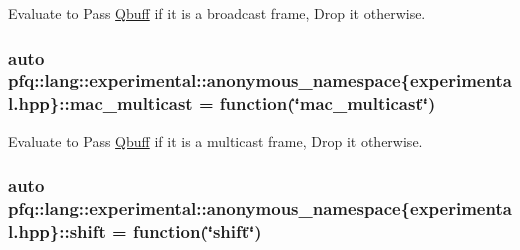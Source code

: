 Evaluate to {\ttfamily Pass} \hyperlink{structpfq_1_1lang_1_1Qbuff}{Qbuff} if it is a broadcast frame, {\ttfamily Drop} it otherwise. 

\subsubsection[{\texorpdfstring{mac\+\_\+multicast}{mac_multicast}}]{\setlength{\rightskip}{0pt plus 5cm}auto pfq\+::lang\+::experimental\+::anonymous\+\_\+namespace\{experimental.\+hpp\}\+::mac\+\_\+multicast = {\bf function}(\char`\"{}mac\+\_\+multicast\char`\"{})}\hypertarget{namespacepfq_1_1lang_1_1experimental_1_1anonymous__namespace_02experimental_8hpp_03_a0c39849f9e3e8677342842f88a8ee37c}{}\label{namespacepfq_1_1lang_1_1experimental_1_1anonymous__namespace_02experimental_8hpp_03_a0c39849f9e3e8677342842f88a8ee37c}


Evaluate to {\ttfamily Pass} \hyperlink{structpfq_1_1lang_1_1Qbuff}{Qbuff} if it is a multicast frame, {\ttfamily Drop} it otherwise. 

\subsubsection[{\texorpdfstring{shift}{shift}}]{\setlength{\rightskip}{0pt plus 5cm}auto pfq\+::lang\+::experimental\+::anonymous\+\_\+namespace\{experimental.\+hpp\}\+::shift = {\bf function}(\char`\"{}shift\char`\"{})}\hypertarget{namespacepfq_1_1lang_1_1experimental_1_1anonymous__namespace_02experimental_8hpp_03_ae2d4991027ccd4f2ad64a1e02bfa4679}{}\label{namespacepfq_1_1lang_1_1experimental_1_1anonymous__namespace_02experimental_8hpp_03_ae2d4991027ccd4f2ad64a1e02bfa4679}


